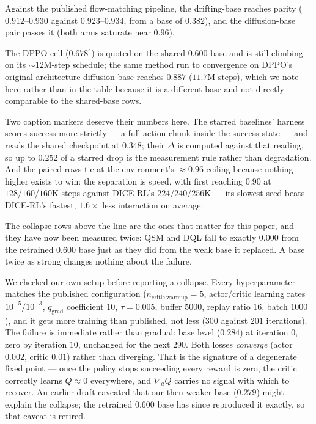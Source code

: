 Against the published flow-matching pipeline, the drifting-base \method{}
reaches parity ($0.912$--$0.930$ against $0.923$--$0.934$, from a base of
$0.382$), and the diffusion-base pair passes it (both arms saturate near
$0.96$).

The DPPO cell ($0.678^{\circ}$) is quoted on the shared $0.600$ base and is
still climbing on its ${\sim}12$M-step schedule; the same method run to
convergence on DPPO's original-architecture diffusion base reaches $0.887$
($11.7$M steps), which we note here rather than in the table because it is a
different base and not directly comparable to the shared-base rows.

Two caption markers deserve their numbers here. The starred baselines'
harness scores success more strictly --- a full action chunk inside the
success state --- and reads the shared checkpoint at $0.348$; their $\Delta$
is computed against that reading, so up to $0.252$ of a starred drop is the
measurement rule rather than degradation. And the paired rows tie at the
environment's ${\approx}0.96$ ceiling because nothing higher exists to win:
the separation is speed, with \method{} first reaching $0.90$ at
$128/160/160$K steps against DICE-RL's $224/240/256$K --- its slowest seed
beats DICE-RL's fastest, $1.6\times$ less interaction on average.

The collapse rows above the line are the ones that matter for this paper,
and they have now been measured twice: QSM and DQL fall to exactly $0.000$
from the retrained $0.600$ base just as they did from the weak base it
replaced. A base twice as strong changes nothing about the failure.

We checked our own setup before reporting a collapse. Every hyperparameter
matches the published configuration ($n_{\mathrm{critic\ warmup}}{=}5$,
actor/critic learning rates $10^{-5}/10^{-3}$, $q_{\mathrm{grad}}$
coefficient $10$, $\tau{=}0.005$, buffer $5000$, replay ratio $16$, batch
$1000$), and it gets more training than published, not less ($300$ against
$201$ iterations). The failure is immediate rather than gradual: base level
($0.284$) at iteration $0$, zero by iteration $10$, unchanged for the next
$290$. Both losses \emph{converge} (actor $0.002$, critic $0.01$) rather
than diverging. That is the signature of a degenerate fixed point --- once
the policy stops succeeding every reward is zero, the critic correctly
learns $Q\approx 0$ everywhere, and $\nabla_a Q$ carries no signal with
which to recover. An earlier draft caveated that our then-weaker base
($0.279$) might explain the collapse; the retrained $0.600$ base has since
reproduced it exactly, so that caveat is retired.

